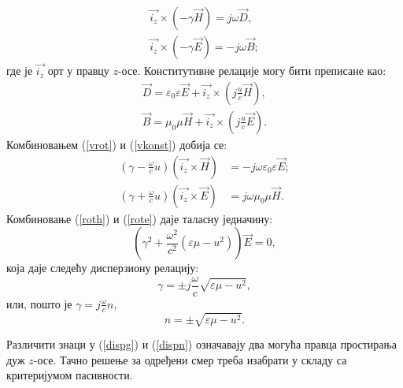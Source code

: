 \documentclass[main.tex]{subfiles}
\begin{document}
\begin{equation}\label{vrot}
\begin{split}
\vec{i_z}\times \left( -\gamma\vec{H} \right) = j\omega\vec{D},\\
\vec{i_z}\times \left( -\gamma\vec{E} \right) = -j\omega\vec{B};
\end{split}
\end{equation}
где је $\vec{i_z}$ орт у правцу $z$-осе. Конститутивне релације могу бити преписане као:
\begin{equation}\label{vkonst}
\begin{split}
\vec{D} = \varepsilon_0\varepsilon \vec{E} + \vec{i_z}\times \left( j\frac{u}{c}\vec{H} \right),\\
\vec{B} = \mu_0\mu \vec{H} + \vec{i_z}\times \left( j\frac{u}{c}\vec{E} \right).
\end{split}
\end{equation}
Комбиновањем (\ref{vrot}) и (\ref{vkonst}) добија се:
\begin{align}
(\gamma - \frac{\omega}{c} u)\left( \vec{i_z}\times\vec{H} \right) &= -j\omega\varepsilon_0\varepsilon\vec{E};\label{roth}\\
(\gamma + \frac{\omega}{c} u)\left( \vec{i_z}\times\vec{E} \right) &= j\omega\mu_0\mu\vec{H}.\label{rote}
\end{align}
Комбиновање (\ref{roth}) и (\ref{rote}) даје таласну једначину:
\begin{equation}
\left(\gamma^2+\frac{\omega^2}{c^2}\left(\varepsilon\mu -u^2\right)\right)\vec{E}=0,
\end{equation}
која даје следећу дисперзиону релацију:
\begin{equation}\label{dispg}
\gamma=\pm j\frac{\omega}{c}\sqrt{\varepsilon\mu - u^2},
\end{equation}
или, пошто је $\gamma=j\frac{\omega}{c}n$,
\begin{equation}\label{dispn}
n = \pm \sqrt{\varepsilon\mu - u^2}.
\end{equation}

Различити знаци у (\ref{dispg}) и (\ref{dispn}) означавају два могућа правца простирања дуж  $z$-осе. Тачно решење за одређени смер треба изабрати у складу са критеријумом пасивности.
\end{document}
